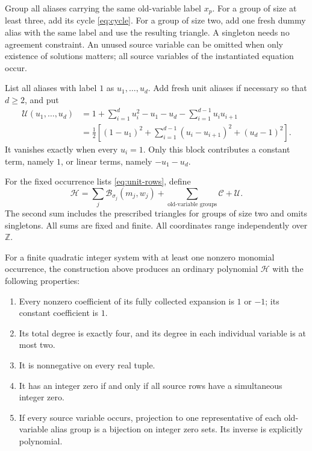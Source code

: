 Group all aliases carrying the same old-variable label $x_p$.
For a group of size at least three, add its cycle \eqref{eq:cycle}.
For a group of size two, add one fresh dummy alias with the same label
and use the resulting triangle. A singleton needs no agreement
constraint. An unused source variable can be omitted when only existence
of solutions matters; all source variables of the instantiated equation
occur.

List all aliases with label $1$ as $u_1,\ldots,u_d$. Add fresh unit
aliases if necessary so that $d\ge2$, and put
\begin{align}
 \mathcal U(u_1,\ldots,u_d)
   & =1+\sum_{i=1}^d u_i^2-u_1-u_d
       -\sum_{i=1}^{d-1}u_i u_{i+1}\label{eq:unit-anchor}\\
   & =\frac12\left[(1-u_1)^2+
       \sum_{i=1}^{d-1}(u_i-u_{i+1})^2+(u_d-1)^2\right].
       \nonumber
\end{align}
It vanishes exactly when every $u_i=1$. Only this block contributes a
constant term, namely $1$, or linear terms, namely $-u_1-u_d$.

\begin{definition}\label{def:heightone}
For the fixed occurrence lists \eqref{eq:unit-rows}, define
\begin{equation}
 \mathcal H=
 \sum_j\mathcal B_{\sigma_j}(m_j,w_j)
   +\sum_{\text{old-variable groups}}\mathcal C
   +\mathcal U.
 \label{eq:heightone}
\end{equation}
The second sum includes the prescribed triangles for groups of size two
and omits singletons. All sums are fixed and finite. All coordinates
range independently over $\mathbb Z$.
\end{definition}

\begin{theorem}\label{thm:heightone}
For a finite quadratic integer system with at least one nonzero monomial
occurrence, the construction above
produces an ordinary polynomial $\mathcal H$ with the following properties:
\begin{enumerate}
\item Every nonzero coefficient of its fully collected expansion is
      $1$ or $-1$; its constant coefficient is $1$.
\item Its total degree is exactly four, and its degree in each individual
      variable is at most two.
\item It is nonnegative on every real tuple.
\item It has an integer zero if and only if all source rows have a
      simultaneous integer zero.
\item If every source variable occurs, projection to one representative
      of each old-variable alias group is a bijection on integer zero
      sets. Its inverse is explicitly polynomial.
\end{enumerate}
\end{theorem}

